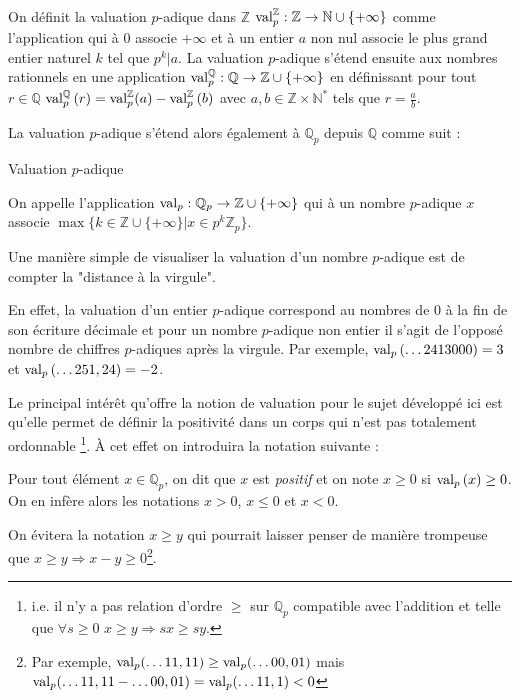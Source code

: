 On définit la valuation $p$-adique dans $\mathbb{Z}$ $\text{val}_p^{\mathbb{Z}}:\mathbb{Z}\to \mathbb{N}\cup \{+\infty\}  $ comme l'application qui à 0 associe $+\infty$ et à un entier $a$ non nul associe le plus grand entier naturel $k$ tel que $p^k | a$.
La valuation $p$-adique s'étend ensuite aux nombres rationnels en une application $\text{val}_p^{\mathbb{Q}} : \mathbb{Q} \to \mathbb{Z}\cup \{+\infty\}   $ en définissant pour tout $r \in \mathbb{Q}$  $\text{val}_p^{\mathbb{Q}} \left( r \right) = \text{val}_p^\mathbb{Z}(a)- \text{val}_p^\mathbb{Z}\left( b \right) $ avec $a,b \in \mathbb{Z} \times \mathbb{N}^*$ tels que $r=\frac{a}{b}.$   

La valuation $p$-adique s'étend alors également à $\mathbb{Q}_p$ depuis $\mathbb{Q}$ comme suit :
\begin{definition} Valuation $p$-adique
  
	On appelle  l'application $\text{val}_p: \mathbb{Q}_p \to \mathbb{Z}\cup \{+\infty\}  $ qui à un nombre $p$-adique $x$ associe $\max \{k \in \mathbb{Z}\cup \{+\infty\}| x\in p^k \mathbb{Z}_p\}$. 
\end{definition}
Une manière simple de visualiser la valuation d'un nombre $p$-adique est de compter la "distance à la virgule".

En effet, la valuation d'un entier $p$-adique correspond au nombres de $0$ à la fin de son écriture décimale et pour un nombre $p$-adique non entier il s'agit de l'opposé nombre de chiffres $p$-adiques après la virgule. Par exemple, $\text{val}_p\left( \ldots 2413000 \right) = 3$ et $\text{val}_p\left( \ldots 251,24 \right) = -2$.

Le principal intérêt qu'offre la notion de valuation pour le sujet développé ici est qu'elle permet de définir la positivité dans un corps qui n'est pas totalement ordonnable \footnote{i.e. il n'y a pas relation d'ordre $\ge $ sur $\mathbb{Q}_{p}$ compatible avec l'addition et telle que $\forall s\ge 0$ $x\ge y \Rightarrow sx\ge sy$.}. À cet effet on introduira la notation suivante :
\begin{notation}
	Pour tout élément $x \in \mathbb{Q}_{p} $, on dit que $x$ est \hypertarget{positif}{\textit{positif}} et on note $x\ge 0$ si $\text{val}_p\left(x\right)\ge 0$. On en infère alors les notations $x> 0$, $x\le 0$ et $x<0$.  
\end{notation}

        On évitera la notation $x\ge y$ qui pourrait laisser penser de manière trompeuse que $x\ge y \Rightarrow x-y\ge 0$\footnote{Par exemple, $\text{val}_p(\ldots11,11) \ge \text{val}_p(\ldots00,01) $ mais $\text{val}_p(\ldots11,11 - \ldots00,01) = \text{val}_p( \ldots 11,1) < 0$}.

